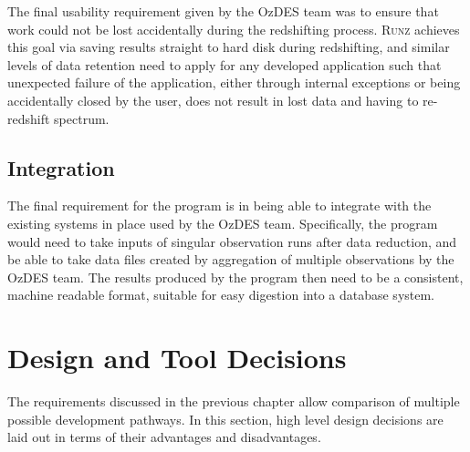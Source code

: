 \documentclass[titlesmallcaps, examinerscopy, copyrightpage]{uqthesis}
\newcommand{\runz}{\textsc{Runz}}
\begin{document}
The final usability requirement given by the OzDES team was to ensure that work could not be lost accidentally during the redshifting process. \runz{} achieves this goal via saving results straight to hard disk during redshifting, and similar levels of data retention need to apply for any developed application such that unexpected failure of the application, either through internal exceptions or being accidentally closed by the user, does not result in lost data and having to re-redshift spectrum.




\section{Integration}

The final requirement for the program is in being able to integrate with the existing systems in place used by the OzDES team. Specifically, the program would need to take inputs of singular observation runs after data reduction, and be able to take data files created by aggregation of multiple observations by the OzDES team. The results produced by the program then need to be a consistent, machine readable format, suitable for easy digestion into a database system.










































\chapter{Design and Tool Decisions}
\label{ch:design}

The requirements discussed in the previous chapter allow comparison of multiple possible development pathways. In this section, high level design decisions are laid out in terms of their advantages and disadvantages. 
\end{document}
